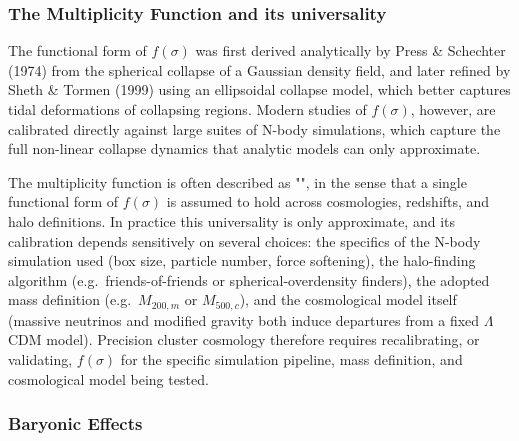 \subsubsection{The Multiplicity Function and its universality} \label{subsubsec:multiplicity_function}

The functional form of $f(\sigma)$ was first derived analytically by Press \& Schechter (1974) from the spherical collapse of a Gaussian density field, and later refined by Sheth \& Tormen (1999) using an ellipsoidal collapse model, which better captures tidal deformations of collapsing regions. Modern studies of $f(\sigma)$, however, are calibrated directly against large suites of N-body simulations, which capture the full non-linear collapse dynamics that analytic models can only approximate.

\smallskip

The multiplicity function is often described as "", in the sense that a single functional form of $f(\sigma)$ is assumed to hold across cosmologies, redshifts, and halo definitions. In practice this universality is only approximate, and its calibration depends sensitively on several choices: the specifics of the N-body simulation used (box size, particle number, force softening), the halo-finding algorithm (e.g.\ friends-of-friends or spherical-overdensity finders), the adopted mass definition (e.g.\ $M_{200,m}$ or $M_{500,c}$), and the cosmological model itself (massive neutrinos and modified gravity both induce departures from a fixed $\Lambda$CDM model). Precision cluster cosmology therefore requires recalibrating, or validating, $f(\sigma)$ for the specific simulation pipeline, mass definition, and cosmological model being tested.

\subsubsection{Baryonic Effects} \label{subsubsec:hmf_baryons}

